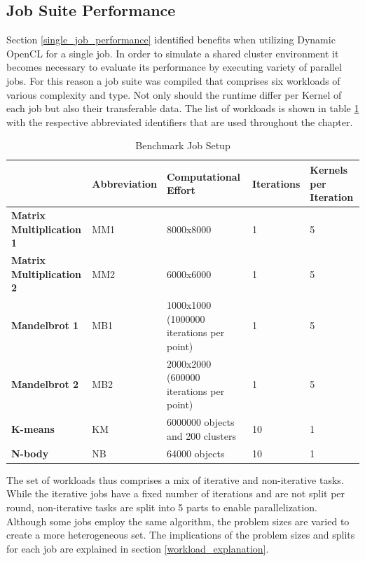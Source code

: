 \subsection{Job Suite Performance}
\label{job_suite_performance}

Section \ref{single_job_performance} identified benefits when utilizing Dynamic OpenCL for a single job. In order to simulate a shared cluster environment it becomes necessary to evaluate its performance by executing variety of parallel jobs. For this reason a job suite was compiled that comprises six workloads of various complexity and type. Not only should the runtime differ per Kernel of each job but also their transferable data. The list of workloads is shown in table \ref{table:benchmark_job_setup} with the respective abbreviated identifiers that are used throughout the chapter.

\begin{table}[!htb]
	\centering
	\begin{adjustbox}{width=0.95\textwidth}
		\small
		\begin{tabular}{l | l | l | l | l}
			~ & \textbf{Abbreviation}						& \textbf{Computational Effort}		& \textbf{Iterations}	& \textbf{Kernels per Iteration} \\
			\hline
			\textbf{Matrix Multiplication 1}	& MM1  	& 8000x8000  								& 1 	& 5 \\
			\textbf{Matrix Multiplication 2} 	& MM2	& 6000x6000  								& 1		& 5 \\
			\textbf{Mandelbrot 1}     		 	& MB1	& 1000x1000 (1000000 iterations per point) 	& 1		& 5 \\
			\textbf{Mandelbrot 2}				& MB2	& 2000x2000 (600000 iterations per point)  	& 1		& 5 \\
			\textbf{K-means}          			& KM 	& 6000000 objects and 200 clusters  		& 10	& 1 \\
			\textbf{N-body}    		 			& NB 	& 64000 objects  							& 10	& 1 \\		
		\end{tabular}
	\end{adjustbox}
	
	\caption{Benchmark Job Setup}
	\label{table:benchmark_job_setup}
\end{table}

The set of workloads thus comprises a mix of iterative and non-iterative tasks. While the iterative jobs have a fixed number of iterations and are not split per round, non-iterative tasks are split into 5 parts to enable parallelization. Although some jobs employ the same algorithm, the problem sizes are varied to create a more heterogeneous set. The implications of the problem sizes and splits for each job are explained in section \ref{workload_explanation}.

